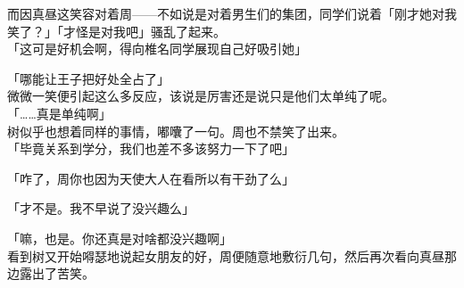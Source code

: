 而因真昼这笑容对着周——不如说是对着男生们的集团，同学们说着「刚才她对我笑了？」「才怪是对我吧」骚乱了起来。\\

「这可是好机会啊，得向椎名同学展现自己好吸引她」

「哪能让王子把好处全占了」\\

微微一笑便引起这么多反应，该说是厉害还是说只是他们太单纯了呢。\\

「……真是单纯啊」\\

树似乎也想着同样的事情，嘟囔了一句。周也不禁笑了出来。\\

「毕竟关系到学分，我们也差不多该努力一下了吧」

「咋了，周你也因为天使大人在看所以有干劲了么」

「才不是。我不早说了没兴趣么」

「嘛，也是。你还真是对啥都没兴趣啊」\\

看到树又开始嘚瑟地说起女朋友的好，周便随意地敷衍几句，然后再次看向真昼那边露出了苦笑。
